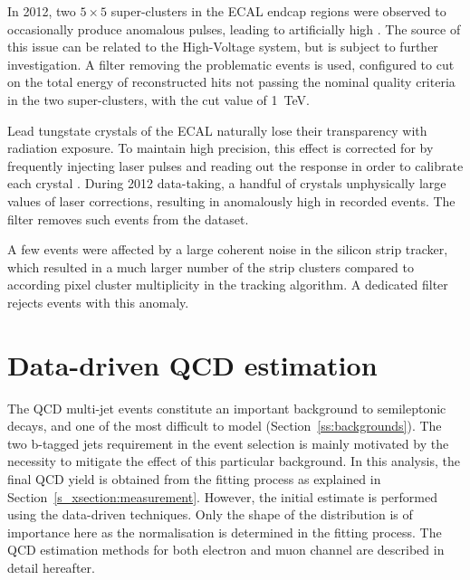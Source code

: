 \begin{description}[wide=\parindent]
	\item[Bad ECAL endcap super-cluster filter.] In 2012, two $5\times5$ super-clusters in the ECAL endcap regions were
	observed to occasionally produce anomalous pulses, leading to artificially high \MET. The source of this issue can
	be related to the High-Voltage system, but is subject to further investigation. A filter removing the problematic
	events is used, configured to cut on the total energy of reconstructed hits not passing the nominal quality criteria
	in the two super-clusters, with the cut value of \SI{1}{\TeV}.

	\item[ECAL laser correction filter.] Lead tungstate crystals of the ECAL naturally lose their transparency with
	radiation exposure. To maintain high precision, this effect is corrected for by frequently injecting laser pulses
	and reading out the response in order to calibrate each crystal \autocite{CMS_TDR1}. During 2012 data-taking, a
	handful of crystals unphysically large values of laser corrections, resulting in anomalously high \MET in recorded
	events. The filter removes such events from the dataset.

	\item[Strip tracker noise filter.] A few events were affected by a large coherent noise in the silicon strip
	tracker, which resulted in a much larger number of the strip clusters compared to according pixel cluster
	multiplicity in the tracking algorithm. A dedicated filter rejects events with this anomaly.

\end{description}

\section{Data-driven QCD estimation}
\label{s_xsection:data_driven_QCD}
The QCD multi-jet events constitute an important background to semileptonic \ttbar decays, and one of the most
difficult to model (Section~\ref{ss:backgrounds}). The two b-tagged jets requirement in the event selection is mainly
motivated by the necessity to mitigate the effect of this particular background. In this analysis, the final QCD yield
is obtained from the fitting process as explained in Section~\ref{s_xsection:measurement}. However, the initial estimate
is performed using the data-driven techniques. Only the shape of the distribution is of importance here as the
normalisation is determined in the fitting process. The QCD estimation methods for both electron and muon channel are
described in detail hereafter.

